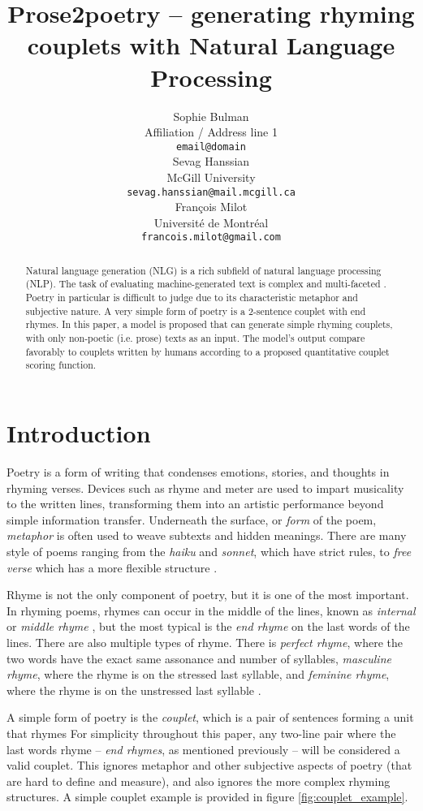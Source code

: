 \documentclass[11pt,a4paper]{article}
\title{Prose2poetry -- generating rhyming couplets with Natural Language Processing}
\author{Sophie Bulman \\
  Affiliation / Address line 1 \\
  \texttt{email@domain} \\\And
  Sevag Hanssian \\
  McGill University \\
  \texttt{sevag.hanssian@mail.mcgill.ca} \\\AND
  François Milot \\
  Université de Montréal \\
  \texttt{francois.milot@gmail.com} \\}
\date{}
\begin{document}
\maketitle
\begin{abstract}
	Natural language generation (NLG) is a rich subfield of natural language processing (NLP). The task of evaluating machine-generated text is complex and multi-faceted \cite{maluuba}. Poetry in particular is difficult to judge due to its characteristic metaphor and subjective nature. A very simple form of poetry is a 2-sentence couplet with end rhymes. In this paper, a model is proposed that can generate simple rhyming couplets, with only non-poetic (i.e. prose) texts as an input. The model's output compare favorably to couplets written by humans according to a proposed quantitative couplet scoring function.
\end{abstract}

\section{Introduction}
\label{sec:intro}

Poetry is a form of writing that condenses emotions, stories, and thoughts in rhyming verses. Devices such as rhyme and meter are used to impart musicality to the written lines, transforming them into an artistic performance beyond simple information transfer. Underneath the surface, or \textit{form} of the poem, \textit{metaphor} is often used to weave subtexts and hidden meanings. There are many style of poems ranging from the \textit{haiku} and \textit{sonnet}, which have strict rules, to \textit{free verse} which has a more flexible structure \citep{poem_type}.

Rhyme is not the only component of poetry, but it is one of the most important. In rhyming poems, rhymes can occur in the middle of the lines, known as \textit{internal} or \textit{middle rhyme} \cite{internal_rhyme_def}, but the most typical is the \textit{end rhyme} \cite{end_rhyme_def} on the last words of the lines. There are also multiple types of rhyme. There is \textit{perfect rhyme}, where the two words have the exact same assonance and number of syllables, \textit{masculine rhyme}, where the rhyme is on the stressed last syllable, and \textit{feminine rhyme}, where the rhyme is on the unstressed last syllable \citep{poem_rhyme_type}.

A simple form of poetry is the \textit{couplet}, which is a pair of sentences forming a unit that rhymes \cite{couplet_def} For simplicity throughout this paper, any two-line pair where the last words rhyme -- \textit{end rhymes}, as mentioned previously -- will be considered a valid couplet. This ignores metaphor and other subjective aspects of poetry (that are hard to define and measure), and also ignores the more complex rhyming structures. A simple couplet example is provided in figure \ref{fig:couplet_example}.
\end{document}
